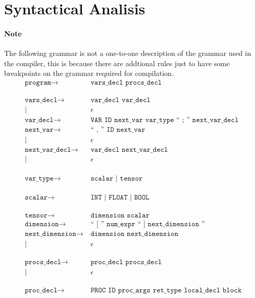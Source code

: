 \section{Syntactical Analisis}
\paragraph{Note} The following grammar is not a one-to-one description of the
grammar used in the compiler, this is because there are addtional rules just to
have some breakpoints on the grammar required for compilation.
\begin{align*}
	\texttt{program}
	\rightarrow&\ \texttt{vars\_decl procs\_decl}\\
	\phantom{0}\\
	\texttt{vars\_decl}
	\rightarrow&\ \texttt{var\_decl var\_decl}\\
            |&\ \epsilon\\
	\texttt{var\_decl}
	\rightarrow&\ \texttt{VAR ID next\_var var\_type `` ; '' next\_var\_decl}\\
	\texttt{next\_var}
	\rightarrow&\ \texttt{`` , '' ID next\_var}\\
            |&\ \epsilon\\
	\texttt{next\_var\_decl}
	\rightarrow&\ \texttt{var\_decl next\_var\_decl}\\
            |&\ \epsilon\\
	\phantom{0}\\
	\texttt{var\_type}
	\rightarrow&\ \texttt{scalar | tensor}\\
	\phantom{0}\\
	\texttt{scalar}
	\rightarrow&\ \texttt{INT | FLOAT | BOOL}\\
	\phantom{0}\\
	\texttt{tensor}
	\rightarrow&\ \texttt{dimension scalar}\\
	\texttt{dimension}
	\rightarrow&\ \texttt{`` [ '' num\_expr `` ] next\_dimension ''}\\
	\texttt{next\_dimension}
	\rightarrow&\ \texttt{dimension next\_dimension}\\
            |&\ \epsilon\\
	\phantom{0}\\
	\texttt{procs\_decl}
	\rightarrow&\ \texttt{proc\_decl procs\_decl}\\
            |&\ \epsilon\\
	\phantom{0}\\
	\texttt{proc\_decl}
	\rightarrow&\ \texttt{PROC ID proc\_args ret\_type local\_decl block}\\

\end{align*}

